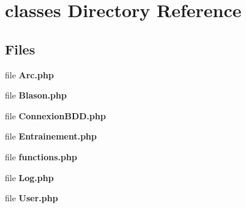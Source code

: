 \section{classes Directory Reference}
\label{dir_b02e4219757ae4e3a0f1714873865bbf}
\subsection*{Files}
\begin{DoxyCompactItemize}
\item 
file \textbf{ Arc.\+php}
\item 
file \textbf{ Blason.\+php}
\item 
file \textbf{ Connexion\+B\+D\+D.\+php}
\item 
file \textbf{ Entrainement.\+php}
\item 
file \textbf{ functions.\+php}
\item 
file \textbf{ Log.\+php}
\item 
file \textbf{ User.\+php}
\end{DoxyCompactItemize}
